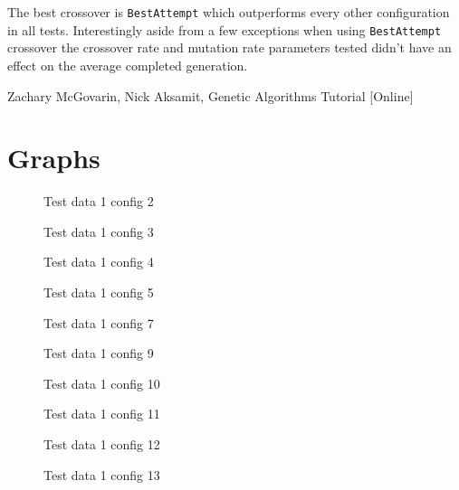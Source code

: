 \documentclass[conference]{IEEEtran}
\begin{document}
The best crossover is \texttt{BestAttempt} which outperforms every other configuration in all tests. Interestingly aside from a few exceptions when using \texttt{BestAttempt} crossover the crossover rate and mutation rate parameters tested didn't have an effect on the average completed generation.  

\begin{thebibliography}{00}
 Zachary McGovarin, Nick Aksamit, Genetic Algorithms Tutorial [Online]
\end{thebibliography}

\appendices
\label{appendix:a}

\section{Graphs}

\begin{figure}[H]
    \centering
    
    \caption{Test data 1 config 2}
    \label{fig:td1_config2}
\end{figure}
\begin{figure}[H]
    \centering
    
    \caption{Test data 1 config 3}
    \label{fig:td1_config3}
\end{figure}
\begin{figure}[H]
    \centering
    
    \caption{Test data 1 config 4}
    \label{fig:td1_config4}
\end{figure}
\begin{figure}[H]
    \centering
    
    \caption{Test data 1 config 5}
    \label{fig:td1_config5}
\end{figure}
\begin{figure}[H]
    \centering
    
    \caption{Test data 1 config 7}
    \label{fig:td1_config7}
\end{figure}
\begin{figure}[H]
    \centering
    
    \caption{Test data 1 config 9}
    \label{fig:td1_config9}
\end{figure}
\begin{figure}[H]
    \centering
    
    \caption{Test data 1 config 10}
    \label{fig:td1_config10}
\end{figure}
\begin{figure}[H]
    \centering
    
    \caption{Test data 1 config 11}
    \label{fig:td1_config11}
\end{figure}
\begin{figure}[H]
    \centering
    
    \caption{Test data 1 config 12}
    \label{fig:td1_config12}
\end{figure}
\begin{figure}[H]
    \centering
    
    \caption{Test data 1 config 13}
    \label{fig:td1_config13}
\end{figure}
\end{document}
